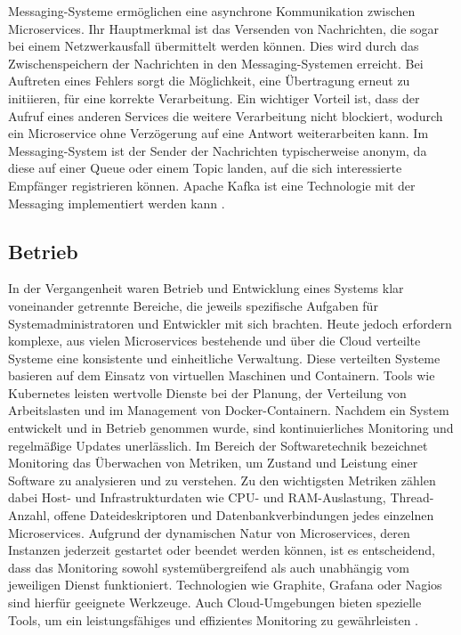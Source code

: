 {Messaging-Systeme ermöglichen eine asynchrone Kommunikation zwischen Microservices. Ihr Hauptmerkmal ist das Versenden von Nachrichten, die sogar bei einem Netzwerkausfall übermittelt werden können. Dies wird durch das Zwischenspeichern der Nachrichten in den Messaging-Systemen erreicht. Bei Auftreten eines Fehlers sorgt die Möglichkeit, eine Übertragung erneut zu initiieren, für eine korrekte Verarbeitung. Ein wichtiger Vorteil ist, dass der Aufruf eines anderen Services die weitere Verarbeitung nicht blockiert, wodurch ein Microservice ohne Verzögerung auf eine Antwort weiterarbeiten kann. Im Messaging-System ist der Sender der Nachrichten typischerweise anonym, da diese auf einer Queue oder einem Topic landen, auf die sich interessierte Empfänger registrieren können. Apache Kafka ist eine Technologie mit der Messaging implementiert werden kann \cite[S. 183 - 187]{wolff} \cite[S.87-88]{newman}.

\pagebreak 
\subsection{Betrieb}

In der Vergangenheit waren Betrieb und Entwicklung eines Systems klar voneinander getrennte Bereiche, die jeweils spezifische Aufgaben für Systemadministratoren und Entwickler mit sich brachten. Heute jedoch erfordern komplexe, aus vielen Microservices bestehende und über die Cloud verteilte Systeme eine konsistente und einheitliche Verwaltung. Diese verteilten Systeme basieren auf dem Einsatz von virtuellen Maschinen und Containern. Tools wie Kubernetes leisten wertvolle Dienste bei der Planung, der Verteilung von Arbeitslasten und im Management von Docker-Containern. Nachdem ein System entwickelt und in Betrieb genommen wurde, sind kontinuierliches Monitoring und regelmäßige Updates unerlässlich. Im Bereich der Softwaretechnik bezeichnet Monitoring das Überwachen von Metriken, um Zustand und Leistung einer Software zu analysieren und zu verstehen. Zu den wichtigsten Metriken zählen dabei Host- und Infrastrukturdaten wie CPU- und RAM-Auslastung, Thread-Anzahl, offene Dateideskriptoren und Datenbankverbindungen jedes einzelnen Microservices. Aufgrund der dynamischen Natur von Microservices, deren Instanzen jederzeit gestartet oder beendet werden können, ist es entscheidend, dass das Monitoring sowohl systemübergreifend als auch unabhängig vom jeweiligen Dienst funktioniert. Technologien wie Graphite, Grafana oder Nagios sind hierfür geeignete Werkzeuge. Auch Cloud-Umgebungen bieten spezielle Tools, um ein leistungsfähiges und effizientes Monitoring zu gewährleisten \cite[S.158,179,181]{sommerville} \cite[S.253]{richards} \cite[S. 80-81, S.250-256, S.263-269]{wolff} \cite[S.105-108]{fowlersusan}.

}
